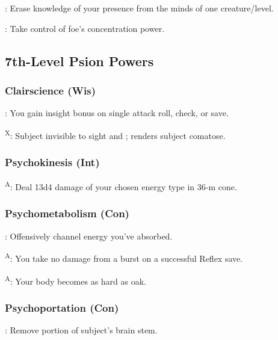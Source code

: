 : Erase knowledge of your presence from the minds of one creature/level.

: Take control of foe's concentration power.




\subsection{7th-Level Psion Powers}


\subsubsection{Clairscience (Wis)}

: You gain insight bonus on single attack roll, check, or save.

\textsuperscript{X}: Subject invisible to sight and ; renders subject comatose.




\subsubsection{Psychokinesis (Int)}

\textsuperscript{A}: Deal 13d4 damage of your chosen energy type in 36-m cone.


\subsubsection{Psychometabolism (Con)}

: Offensively channel energy you've absorbed.

\textsuperscript{A}: You take no damage from a burst on a successful Reflex save.

\textsuperscript{A}: Your body becomes as hard as oak.


\subsubsection{Psychoportation (Con)}

: Remove portion of subject's brain stem.

